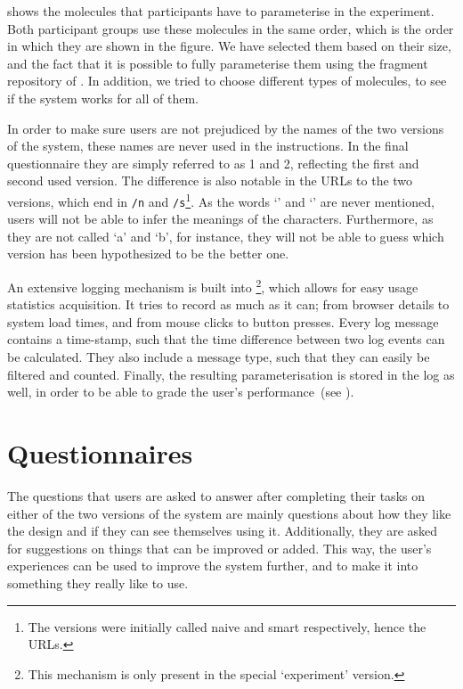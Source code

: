  shows the molecules that participants have to parameterise in the experiment. Both participant groups use these molecules in the same order, which is the order in which they are shown in the figure. We have selected them based on their size, and the fact that it is possible to fully parameterise them using the fragment repository of \oframp. In addition, we tried to choose different types of molecules, to see if the system works for all of them.

In order to make sure users are not prejudiced by the names of the two versions of the system, these names are never used in the instructions. In the final questionnaire they are simply referred to as 1 and 2, reflecting the first and second used version. The difference is also notable in the URLs to the two versions, which end in \verb|/n| and \verb|/s|\footnote{The versions were initially called naive and smart respectively, hence the URLs.}. As the words `\IDa' and `\IDb' are never mentioned, users will not be able to infer the meanings of the characters. Furthermore, as they are not called `a' and `b', for instance, they will not be able to guess which version has been hypothesized to be the better one.

An extensive logging mechanism is built into \oframp\footnote{This mechanism is only present in the special `experiment' version.}, which allows for easy usage statistics acquisition. It tries to record as much as it can; from browser details to system load times, and from mouse clicks to button presses. Every log message contains a time-stamp, such that the time difference between two log events can be calculated. They also include a message type, such that they can easily be filtered and counted. Finally, the resulting parameterisation is stored in the log as well, in order to be able to grade the user's performance~(see ).



\section{Questionnaires}
The questions that users are asked to answer after completing their tasks on either of the two versions of the system are mainly questions about how they like the design and if they can see themselves using it. Additionally, they are asked for suggestions on things that can be improved or added. This way, the user's experiences can be used to improve the system further, and to make it into something they really like to use.

